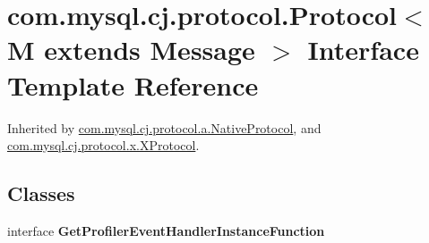 \hypertarget{interfacecom_1_1mysql_1_1cj_1_1protocol_1_1_protocol}{}\section{com.\+mysql.\+cj.\+protocol.\+Protocol$<$ M extends Message $>$ Interface Template Reference}
\label{interfacecom_1_1mysql_1_1cj_1_1protocol_1_1_protocol}


Inherited by \mbox{\hyperlink{classcom_1_1mysql_1_1cj_1_1protocol_1_1a_1_1_native_protocol}{com.\+mysql.\+cj.\+protocol.\+a.\+Native\+Protocol}}, and \mbox{\hyperlink{classcom_1_1mysql_1_1cj_1_1protocol_1_1x_1_1_x_protocol}{com.\+mysql.\+cj.\+protocol.\+x.\+X\+Protocol}}.

\subsection*{Classes}
\begin{DoxyCompactItemize}
\item 
interface {\bfseries Get\+Profiler\+Event\+Handler\+Instance\+Function}
\end{DoxyCompactItemize}
